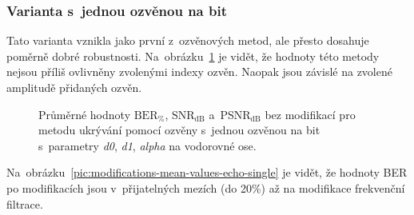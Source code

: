 \subsubsection*{Varianta s~jednou ozvěnou na bit}

Tato varianta vznikla jako první z~ozvěnových metod, ale přesto dosahuje
poměrně dobré robustnosti.
Na~obrázku~\ref{pic:no-mod-params-mean-values-echo-single} je vidět, že hodnoty
této metody nejsou příliš ovlivněny zvolenými indexy ozvěn. Naopak jsou závislé
na zvolené amplitudě přidaných ozvěn.

\begin{figure}[H]
    \table
    \centering
    \caption{Průměrné hodnoty $\mathrm{BER}_{\%}$, $\mathrm{SNR}_\mathrm{dB}$
    a~$\mathrm{PSNR}_\mathrm{dB}$ bez modifikací pro metodu ukrývání pomocí
    ozvěny s~jednou ozvěnou na bit s~parametry \textit{d0}, \textit{d1},
    \textit{alpha} na vodorovné ose.}
    \label{pic:no-mod-params-mean-values-echo-single}
\end{figure}

Na~obrázku~\ref{pic:modifications-mean-values-echo-single} je vidět, že hodnoty
BER po modifikacích jsou v~přijatelných mezích (do 20\%) až na modifikace
frekvenční filtrace.

